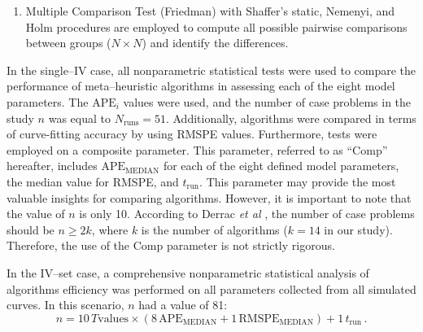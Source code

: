 \documentclass[a4paper,fleqn]{cas-dc}
\begin{document}
\begin{enumerate}[1.]
\item
Multiple Comparison Test (Friedman) with Shaffer’s static, Nemenyi, and Holm procedures
are employed to compute all possible pairwise comparisons between groups ($N\times N$)
and identify the differences.

\end{enumerate}

In the single--IV case, all nonparametric statistical tests were used to compare the performance of meta--heuristic algorithms in assessing each of the eight model parameters.
The $\mathrm{APE}_i$ values were used, and the number of case problems in the study $n$ was equal to $N_\mathrm{runs}=51$.
Additionally, algorithms were compared in terms of curve-fitting accuracy by using RMSPE values.
Furthermore, tests were employed on a composite parameter.
This parameter, referred to as ``Comp'' hereafter, includes $\mathrm{APE}_\mathrm{MEDIAN}$ for each of the eight defined model parameters,
the median value for RMSPE, and $t_\mathrm{run}$.
This parameter may provide the most valuable insights for comparing algorithms. However, it is important to note that the value of $n$ is only 10.
According to Derrac \emph{et al} \cite{Derrac2011}, the number of case problems should be $n\geq 2k$,
where $k$ is the number of algorithms ($k=14$ in our study).
Therefore, the use of the Comp parameter is not strictly rigorous.

In the IV--set case, a comprehensive nonparametric statistical analysis of algorithms efficiency was performed on all parameters collected from all simulated curves.
In this scenario, $n$ had a value of 81:
\begin{equation*}
n= 10\,T\mathrm{values}\times(8\,\mathrm{APE}_\mathrm{MEDIAN}+1\,\mathrm{RMSPE}_\mathrm{MEDIAN})+1\,t_\mathrm{run}\,.
\end{equation*}





\end{document}
